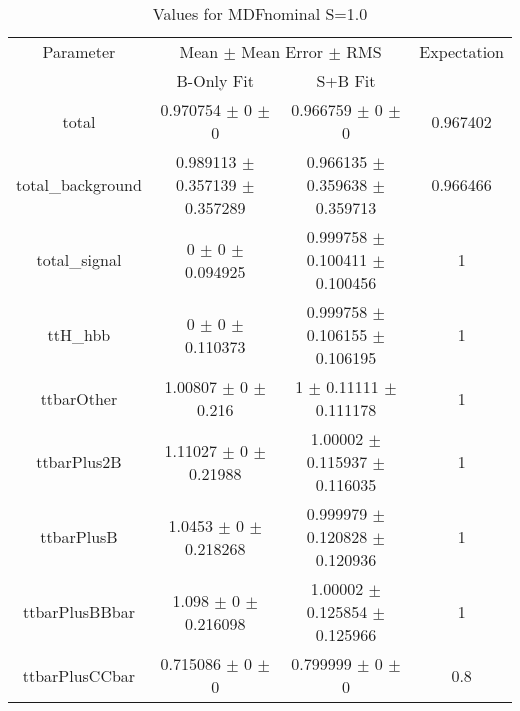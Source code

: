 \begin{table}
\centering
\caption{Values for MDFnominal S=1.0}
\begin{tabular}{cccc}
\toprule
Parameter & \multicolumn{2}{c}{Mean $\pm$ Mean Error $\pm$ RMS} & Expectation\\
 & B-Only Fit & S+B Fit & \\
\midrule
total & \num{0.970754} $\pm$ \num{0} $\pm$ \num{0} & \num{0.966759} $\pm$ \num{0} $\pm$ \num{0} & \num{0.967402}\\
total\_background & \num{0.989113} $\pm$ \num{0.357139} $\pm$ \num{0.357289} & \num{0.966135} $\pm$ \num{0.359638} $\pm$ \num{0.359713} & \num{0.966466}\\
total\_signal & \num{0} $\pm$ \num{0} $\pm$ \num{0.094925} & \num{0.999758} $\pm$ \num{0.100411} $\pm$ \num{0.100456} & \num{1}\\
ttH\_hbb & \num{0} $\pm$ \num{0} $\pm$ \num{0.110373} & \num{0.999758} $\pm$ \num{0.106155} $\pm$ \num{0.106195} & \num{1}\\
ttbarOther & \num{1.00807} $\pm$ \num{0} $\pm$ \num{0.216} & \num{1} $\pm$ \num{0.11111} $\pm$ \num{0.111178} & \num{1}\\
ttbarPlus2B & \num{1.11027} $\pm$ \num{0} $\pm$ \num{0.21988} & \num{1.00002} $\pm$ \num{0.115937} $\pm$ \num{0.116035} & \num{1}\\
ttbarPlusB & \num{1.0453} $\pm$ \num{0} $\pm$ \num{0.218268} & \num{0.999979} $\pm$ \num{0.120828} $\pm$ \num{0.120936} & \num{1}\\
ttbarPlusBBbar & \num{1.098} $\pm$ \num{0} $\pm$ \num{0.216098} & \num{1.00002} $\pm$ \num{0.125854} $\pm$ \num{0.125966} & \num{1}\\
ttbarPlusCCbar & \num{0.715086} $\pm$ \num{0} $\pm$ \num{0} & \num{0.799999} $\pm$ \num{0} $\pm$ \num{0} & \num{0.8}\\
\bottomrule
\end{tabular}
\end{table}